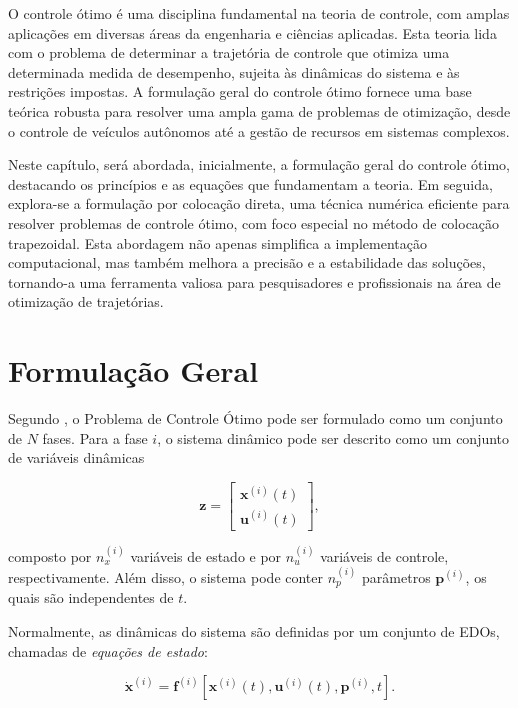 O controle ótimo é uma disciplina fundamental na teoria de controle, com amplas aplicações em diversas áreas da engenharia e ciências aplicadas. Esta teoria lida com o problema de determinar a trajetória de controle que otimiza uma determinada medida de desempenho, sujeita às dinâmicas do sistema e às restrições impostas. A formulação geral do controle ótimo fornece uma base teórica robusta para resolver uma ampla gama de problemas de otimização, desde o controle de veículos autônomos até a gestão de recursos em sistemas complexos.

Neste capítulo, será abordada, inicialmente, a formulação geral do controle ótimo, destacando os princípios e as equações que fundamentam a teoria. Em seguida, explora-se a formulação por colocação direta, uma técnica numérica eficiente para resolver problemas de controle ótimo, com foco especial no método de colocação trapezoidal. Esta abordagem não apenas simplifica a implementação computacional, mas também melhora a precisão e a estabilidade das soluções, tornando-a uma ferramenta valiosa para pesquisadores e profissionais na área de otimização de trajetórias.

\section{Formulação Geral}
\label{sec:formulação-geral}

Segundo \cite{betts_practical_2010}, o Problema de Controle Ótimo pode ser formulado como um conjunto de $N$ fases. Para a fase $i$, o sistema dinâmico pode ser descrito como um conjunto de variáveis dinâmicas

\begin{equation*}
    \mathbf{z} = \begin{bmatrix}
        \mathbf{x}^{(i)}(t) \\
        \mathbf{u}^{(i)}(t)
    \end{bmatrix},
\end{equation*}

\noindent composto por $n_x^{(i)}$ variáveis de estado e por $n_u^{(i)}$ variáveis de controle, respectivamente. Além disso, o sistema pode conter $n_p^{(i)}$ parâmetros $\mathbf{p}^{(i)}$, os quais são independentes de $t$.

Normalmente, as dinâmicas do sistema são definidas por um conjunto de EDOs, chamadas de \textit{equações de estado}:

\begin{equation*}
    \dot{\mathbf{x}}^{(i)} = \mathbf{f}^{(i)} \left[ \mathbf{x}^{(i)}(t), \mathbf{u}^{(i)}(t), \mathbf{p}^{(i)}, t \right].
\end{equation*}

